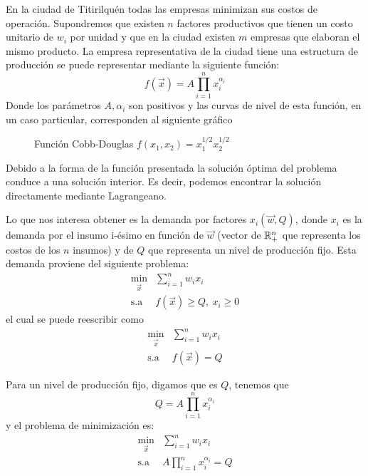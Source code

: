 \begin{ejemplo}\label{ejemplo-micro-1}
En la ciudad de Titirilqu\'en todas las empresas minimizan sus costos de operaci\'on. Supondremos que existen $n$ factores productivos que tienen un costo unitario de $w_i$ por unidad y que en la ciudad existen $m$ empresas que elaboran el mismo producto. La empresa representativa de la ciudad tiene una estructura de producci\'on se puede representar mediante la siguiente funci\'on:
$$f(\vec{x})= A \prod_{i=1}^n x_i^{\alpha_i}$$
Donde los par\'ametros $A,\alpha_i$ son positivos y las curvas de nivel de esta funci\'on, en un caso particular, corresponden al siguiente gr\'afico
\begin{figure}[H]
	\centering
	
	\caption{Funci\'on Cobb-Douglas $f(x_1,x_2)=x_1^{1/2}x_2^{1/2}$}
\end{figure}

Debido a la forma de la funci\'on presentada la soluci\'on \'optima del problema conduce a una soluci\'on interior. Es decir, podemos encontrar la soluci\'on directamente mediante Lagrangeano.

Lo que nos interesa obtener es la demanda por factores $x_i(\vec{w},Q)$, donde $x_i$ es la demanda por el insumo i-\'esimo en funci\'on de $\vec{w}$ (vector de $\mathbb{R}^n_+$ que representa los costos de los $n$ insumos) y de $Q$ que representa un nivel de producci\'on fijo. Esta demanda proviene del siguiente problema:
\begin{equation*}
\begin{array}{cl}
\displaystyle \min_{\vec{x}} 		& \sum_{i=1}^n w_i x_i 	 \\
\text{s.a}					& f(\vec{x}) \geq  Q,\:x_i \geq 0
\end{array}
\end{equation*}
el cual se puede reescribir como
\begin{equation*}
\begin{array}{cl}
\displaystyle \min_{\vec{x}}		& \sum_{i=1}^n w_i x_i 	 \\
\text{s.a}					& f(\vec{x}) =  Q
\end{array}
\end{equation*}

Para un nivel de producci\'on fijo, digamos que es $Q$, tenemos que
$$Q= A \prod_{i=1}^n x_i^{\alpha_i}$$
y el problema de minimizaci\'on es:
\begin{equation*}
\begin{array}{cl}
\displaystyle \min_{\vec{x}}		& \sum_{i=1}^n w_i x_i 	 \\
\text{s.a}					& A \prod_{i=1}^n x_i^{\alpha_i} = Q
\end{array}
\end{equation*}


\end{ejemplo}
